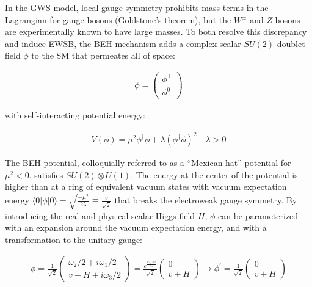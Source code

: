 In the GWS model, local gauge symmetry prohibits mass terms in the Lagrangian for gauge bosons (Goldstone's theorem), but the $W^\pm$ and $Z$ bosons are experimentally known to have large masses.
To both resolve this discrepancy and induce EWSB, the BEH mechanism adds a complex scalar $SU(2)$ doublet field $\phi$ to the SM that permeates all of space:
\begin{linenomath*}
\begin{align}
\phi=\left(\begin{array}{l}
\phi^{+} \\
\phi^0
\end{array}\right)
\end{align}
\end{linenomath*}
with self-interacting potential energy:
\begin{linenomath*}
\begin{align}
V(\phi) = \mu^2 \phi^{\dagger} \phi + \lambda\left(\phi^{\dagger} \phi\right)^2 \quad \lambda >0
\end{align}
\end{linenomath*}
The BEH potential, colloquially referred to as a ``Mexican-hat'' potential for $\mu^2 < 0$, satisfies $SU(2) \otimes U(1)$.
The energy at the center of the potential is higher than at a ring of equivalent vacuum states with vacuum expectation energy $\langle 0 \vert \phi \vert 0 \rangle=\sqrt{\frac{-\mu^2}{2 \lambda}} \equiv \frac{v}{\sqrt{2}}$ that breaks the electroweak gauge symmetry.
By introducing the real and physical scalar Higgs field $H$, $\phi$ can be parameterized with an expansion around the vacuum expectation energy, and with a transformation to the unitary gauge:
\begin{linenomath*}
\begin{align}
\phi
=\frac{1}{\sqrt{2}}
\left(\begin{array}{l}
\omega_2/2 + i \omega_1/2 \\
v + H + i \omega_3/2
\end{array}\right)
= \frac{e^{\frac{ i \omega_j \cdot \sigma^j}{2v}}}{\sqrt{2}}
\left(\begin{array}{c}
0 \\
v+H
\end{array}\right)
\longrightarrow \phi^{\prime} = \frac{1}{\sqrt{2}}
\left(\begin{array}{c}
0 \\
v+H
\end{array}\right)
\end{align}
\end{linenomath*}
